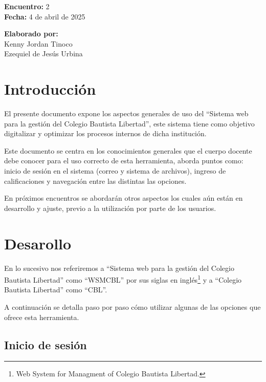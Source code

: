 \documentclass[12pt]{article}
\begin{document}
    \begin{multicols}{2}
        \textbf{Encuentro:} 2\\
        \textbf{Fecha:} 4 de abril de 2025\\
        \begin{flushright}
            \textbf{Elaborado por:}\\
            Kenny Jordan Tinoco\\
            Ezequiel de Jesús Urbina
        \end{flushright}
    \end{multicols}

    \tableofcontents
    \thispagestyle{fancy}

    \section{Introducción}

    El presente documento expone los aspectos generales de uso del ``Sistema web para la gestión del Colegio Bautista Libertad'',
    este sistema tiene como objetivo digitalizar y optimizar los procesos internos de dicha institución.

    Este documento se centra en los conocimientos generales que el cuerpo docente debe conocer para el uso correcto de esta herramienta, 
    aborda puntos como: inicio de sesión en el sistema (correo y sistema de archivos), ingreso de calificaciones y navegación entre las distintas las opciones.

    En próximos encuentros se abordarán otros aspectos los cuales aún están en desarrollo y ajuste, previo a la utilización por parte de los usuarios.

    \section{Desarollo}

    En lo sucesivo nos referiremos a ``Sistema web para la gestión del Colegio Bautista Libertad''
    como ``WSMCBL'' por sus siglas en inglés\footnote{Web System for Managment of Colegio Bautista Libertad.} y
    a ``Colegio Bautista Libertad'' como ``CBL''.

    A continuación se detalla paso por paso cómo utilizar algunas de las opciones que ofrece esta herramienta.
    
    \subsection{Inicio de sesión}
\end{document}
